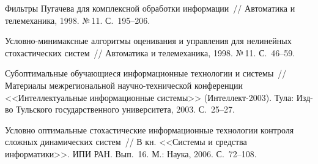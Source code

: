\begin{multicols}{2}
{{\begin{thebibliography}{99}
Фильтры Пугачева для комплексной обработки
информации~// Автоматика и телемеханика, 1998. №\,11. С.~195--206.

Условно-минимаксные алгоритмы оценивания и
управления для нелинейных стохастических систем~// Автоматика и
телемеханика, 1998. №\,11. С.~46--59.

Субоптимальные обучающиеся
информационные технологии и системы~// Материалы межрегиональной
на\-уч\-но-тех\-ни\-че\-ской конференции <<Интеллектуальные
информационные системы>> (Интеллект-2003). Тула:
Изд-во Тульского государственного университета, 2003. С.~25--27.


Условно оптимальные стохастические информационные
технологии  контроля сложных динамических систем~// В кн.
<<Системы и средства информатики>>. ИПИ РАН. Вып.~16. М.: Наука,
2006. С.~72--108.
\end{thebibliography}

}
}

\end{multicols}




\label{end\stat}